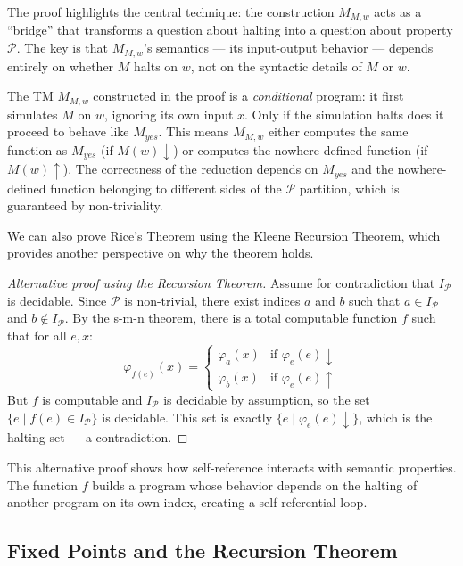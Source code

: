The proof highlights the central technique: the construction $M_{M,w}$ acts as a ``bridge'' that transforms a question about halting into a question about property $\mathcal{P}$. The key is that $M_{M,w}$'s semantics --- its input-output behavior --- depends entirely on whether $M$ halts on $w$, not on the syntactic details of $M$ or $w$.

The TM $M_{M,w}$ constructed in the proof is a \emph{conditional} program: it first simulates $M$ on $w$, ignoring its own input $x$. Only if the simulation halts does it proceed to behave like $M_{yes}$. This means $M_{M,w}$ either computes the same function as $M_{yes}$ (if $M(w) \downarrow$) or computes the nowhere-defined function (if $M(w) \uparrow$). The correctness of the reduction depends on $M_{yes}$ and the nowhere-defined function belonging to different sides of the $\mathcal{P}$ partition, which is guaranteed by non-triviality.

We can also prove Rice's Theorem using the Kleene Recursion Theorem, which provides another perspective on why the theorem holds.

\begin{proof}[Alternative proof using the Recursion Theorem]
Assume for contradiction that $I_\mathcal{P}$ is decidable. Since $\mathcal{P}$ is non-trivial, there exist indices $a$ and $b$ such that $a \in I_\mathcal{P}$ and $b \notin I_\mathcal{P}$. By the s-m-n theorem, there is a total computable function $f$ such that for all $e, x$:
\[
\varphi_{f(e)}(x) = \begin{cases}
\varphi_a(x) & \text{if } \varphi_e(e) \downarrow \\
\varphi_b(x) & \text{if } \varphi_e(e) \uparrow
\end{cases}
\]
But $f$ is computable and $I_\mathcal{P}$ is decidable by assumption, so the set $\{ e \mid f(e) \in I_\mathcal{P} \}$ is decidable. This set is exactly $\{ e \mid \varphi_e(e) \downarrow \}$, which is the halting set --- a contradiction.
\end{proof}

This alternative proof shows how self-reference interacts with semantic properties. The function $f$ builds a program whose behavior depends on the halting of another program on its own index, creating a self-referential loop.

\subsection{Fixed Points and the Recursion Theorem}
\label{sec:rice:fixedpoints}

